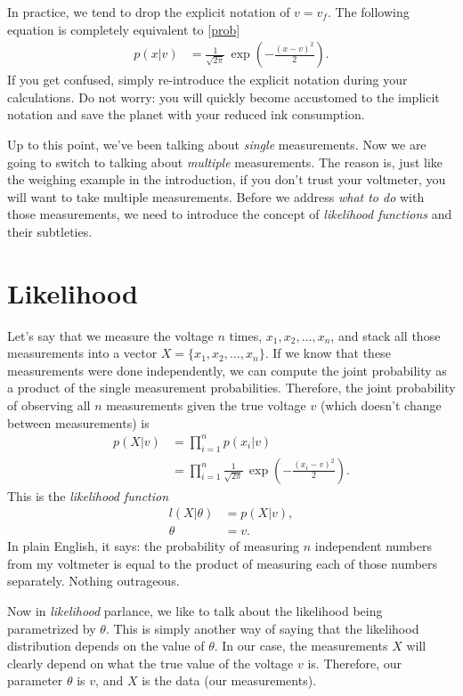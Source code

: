 \documentclass[10pt,letterpaper]{article}
\begin{document}
In practice, we tend to drop the explicit notation of $v=v_f$. The following equation is completely equivalent to \cref{prob}
\begin{align}
	p(x \vert v) &= \frac{1}{\sqrt{2\pi}}\,\exp\left( -\frac{(x-v)^2}{2} \right).
\end{align}
If you get confused, simply re-introduce the explicit notation during your calculations. Do not worry: you will quickly become accustomed to the implicit notation and save the planet with your reduced ink consumption.

Up to this point, we've been talking about \emph{single} measurements. Now we are going to switch to talking about \emph{multiple} measurements. The reason is, just like the weighing example in the introduction, if you don't trust your voltmeter, you will want to take multiple measurements. Before we address \emph{what to do} with those measurements, we need to introduce the concept of \emph{likelihood functions} and their subtleties.

\section{Likelihood}

Let's say that we measure the voltage $n$ times, $x_1, x_2, \ldots, x_n$, and stack all those measurements into a vector $X = \{x_1, x_2, \ldots, x_n\}$. If we know that these measurements were done independently, we can compute the joint probability as a product of the single measurement probabilities. Therefore, the joint probability of observing all $n$ measurements given the true voltage $v$ (which doesn't change between measurements) is
\begin{align}
	p(X\vert v) &= \prod_{i=1}^n p(x_i|v)\\
				&= \prod_{i=1}^n \frac{1}{\sqrt{2\pi}}\,\exp\left( -\frac{(x_i-v)^2}{2} \right).\label{likelihood}
\end{align}
This is the \emph{likelihood function}
\begin{align}
	l(X \vert \theta) &= p(X \vert v),\\
	\theta &= v.
\end{align}
In plain English, it says: the probability of measuring $n$ independent numbers from my voltmeter is equal to the product of measuring each of those numbers separately. Nothing outrageous.

Now in \emph{likelihood} parlance, we like to talk about the likelihood being parametrized by $\theta$. This is simply another way of saying that the likelihood distribution depends on the value of $\theta$. In our case, the measurements $X$ will clearly depend on what the true value of the voltage $v$ is. Therefore, our parameter $\theta$ is $v$, and $X$ is the data (our measurements).
\end{document}
